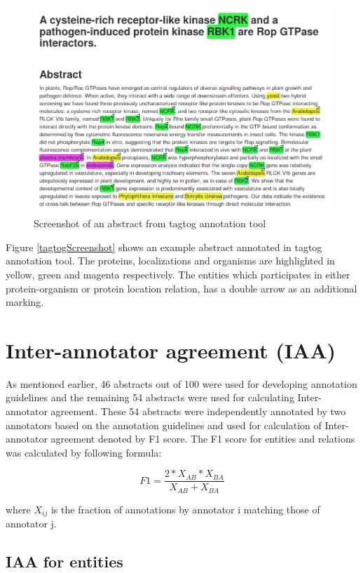 \begin{figure}[hbtp]
\includegraphics[scale=0.4]{figures/tagtog_screenshot.png}
\caption{Screenshot of an abstract from tagtog annotation tool}\label{fig:tagtogScreenshot}
\end{figure}

Figure \ref{tagtogScreenshot} shows an example abstract annotated in tagtog annotation tool. The proteins, localizations and organisms are highlighted in yellow, green and magenta respectively. The entities which participates in either protein-organism or protein location relation, has a double arrow as an additional marking.

\section{Inter-annotator agreement (IAA)}

As mentioned earlier, 46 abstracts out of 100 were used for developing annotation guidelines and the remaining 54 abstracts were used for calculating Inter-annotator agreement. These 54 abstracts were independently annotated by two annotators based on the annotation guidelines and used for calculation of Inter-annotator agreement denoted by F1 score. The F1 score for entities and relations was calculated by following formula:

$$
F1 = \frac{2*X_{AB}*X_{BA}}{X_{AB}+X_{BA}}
$$

where $X_{ij}$ is the fraction of annotations by annotator i matching those of annotator j.

\subsection*{IAA for entities}

